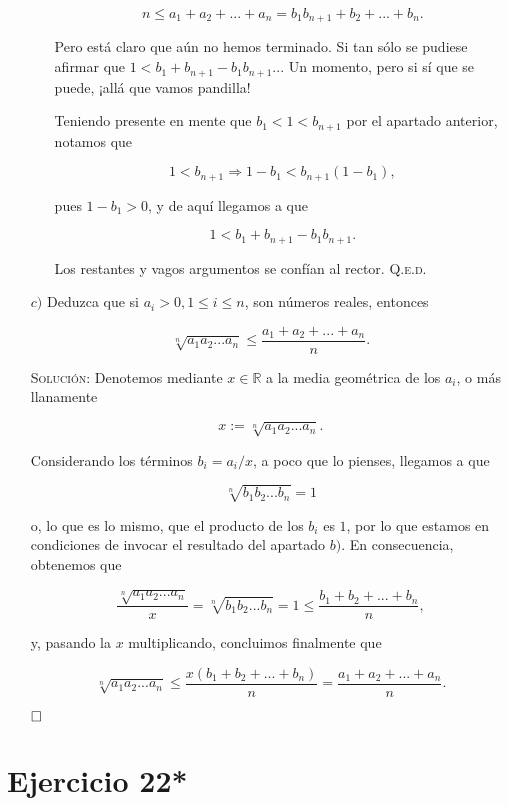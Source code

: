 \documentclass{article}
\begin{document}
\begin{itemize}
\begin{itemize}
        \[n \leq a_1 + a_2 + ... + a_n = b_1b_{n+1} + b_2 + ... + b_n.\]

        Pero está claro que aún no hemos terminado. Si tan sólo se pudiese afirmar que $1 < b_1 + b_{n + 1} - b_1b_{n + 1}$... Un momento, pero si sí que se puede, ¡allá que vamos pandilla!

        Teniendo presente en mente que $b_1 < 1 < b_{n + 1}$ por el apartado anterior, notamos que 

        \[1 < b_{n + 1} \Longrightarrow 1 - b_1 < b_{n + 1}(1 - b_1),\]

        pues $1 - b_1 > 0$, y de aquí llegamos a que

        \[1 < b_1 + b_{n + 1} - b_1b_{n + 1}.\]

        Los restantes y vagos argumentos se confían al rector. \hfill{\textsc{Q.e.d.}}
    \end{itemize}

    \item[$c)$] Deduzca que si $a_i > 0, 1 \leq i \leq n$, son números reales, entonces
    
    \[\sqrt[n]{a_1a_2...a_n} \leq \frac{a_1 + a_2 + ... + a_n}{n}.\]

    \vspace{7px}

    \textsc{Solución}: Denotemos mediante $x \in \mathbb{R}$ a la media geométrica de los $a_i$, o más llanamente

    \[x := \sqrt[n]{a_1a_2...a_n}.\]

    Considerando los términos $b_i = a_i / x$, a poco que lo pienses, llegamos a que

    \[\sqrt[n]{b_1b_2...b_n} = 1\]

    o, lo que es lo mismo, que el producto de los $b_i$ es $1$, por lo que estamos en condiciones de invocar el resultado del apartado $b)$. En consecuencia, obtenemos que

    \[\frac{\sqrt[n]{a_1a_2...a_n}}{x} = \sqrt[n]{b_1b_2...b_n} = 1 \leq \frac{b_1 + b_2 + ... + b_n}{n},\]

    y, pasando la $x$ multiplicando, concluimos finalmente que

    \[\sqrt[n]{a_1a_2...a_n} \leq \frac{x(b_1 + b_2 + ... + b_n)}{n} = \frac{a_1 + a_2 + ... + a_n}{n}.\]

    $\hfill\square$
\end{itemize}

\newpage

\section{Ejercicio 22*}
\end{document}
